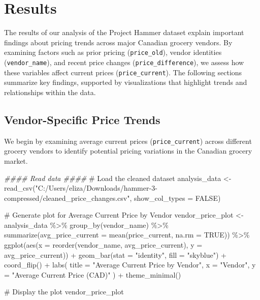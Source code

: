 \documentclass[
  letterpaper,
  DIV=11,
  numbers=noendperiod]{scrartcl}
\newenvironment{Shaded}{\begin{snugshade}}{\end{snugshade}}
\newcommand{\AttributeTok}[1]{\textcolor[rgb]{0.40,0.45,0.13}{#1}}
\newcommand{\CommentTok}[1]{\textcolor[rgb]{0.37,0.37,0.37}{#1}}
\newcommand{\ConstantTok}[1]{\textcolor[rgb]{0.56,0.35,0.01}{#1}}
\newcommand{\DocumentationTok}[1]{\textcolor[rgb]{0.37,0.37,0.37}{\textit{#1}}}
\newcommand{\FunctionTok}[1]{\textcolor[rgb]{0.28,0.35,0.67}{#1}}
\newcommand{\NormalTok}[1]{\textcolor[rgb]{0.00,0.23,0.31}{#1}}
\newcommand{\OtherTok}[1]{\textcolor[rgb]{0.00,0.23,0.31}{#1}}
\newcommand{\SpecialCharTok}[1]{\textcolor[rgb]{0.37,0.37,0.37}{#1}}
\newcommand{\StringTok}[1]{\textcolor[rgb]{0.13,0.47,0.30}{#1}}
\begin{document}
\section{Results}\label{results}

The results of our analysis of the Project Hammer dataset explain
important findings about pricing trends across major Canadian grocery
vendors. By examining factors such as prior pricing
(\texttt{price\_old}), vendor identities (\texttt{vendor\_name}), and
recent price changes (\texttt{price\_difference}), we assess how these
variables affect current prices (\texttt{price\_current}). The following
sections summarize key findings, supported by visualizations that
highlight trends and relationships within the data.

\subsection{Vendor-Specific Price
Trends}\label{vendor-specific-price-trends}

We begin by examining average current prices (\texttt{price\_current})
across different grocery vendors to identify potential pricing
variations in the Canadian grocery market.

\begin{Shaded}
\begin{Highlighting}[]
\DocumentationTok{\#\#\#\# Read data \#\#\#\#}
\CommentTok{\# Load the cleaned dataset}
\NormalTok{analysis\_data }\OtherTok{\textless{}{-}} \FunctionTok{read\_csv}\NormalTok{(}\StringTok{"C:/Users/eliza/Downloads/hammer{-}3{-}compressed/cleaned\_price\_changes.csv"}\NormalTok{, }\AttributeTok{show\_col\_types =} \ConstantTok{FALSE}\NormalTok{)}

\CommentTok{\# Generate plot for Average Current Price by Vendor}
\NormalTok{vendor\_price\_plot }\OtherTok{\textless{}{-}}\NormalTok{ analysis\_data }\SpecialCharTok{\%\textgreater{}\%}
  \FunctionTok{group\_by}\NormalTok{(vendor\_name) }\SpecialCharTok{\%\textgreater{}\%}
  \FunctionTok{summarize}\NormalTok{(}\AttributeTok{avg\_price\_current =} \FunctionTok{mean}\NormalTok{(price\_current, }\AttributeTok{na.rm =} \ConstantTok{TRUE}\NormalTok{)) }\SpecialCharTok{\%\textgreater{}\%}
  \FunctionTok{ggplot}\NormalTok{(}\FunctionTok{aes}\NormalTok{(}\AttributeTok{x =} \FunctionTok{reorder}\NormalTok{(vendor\_name, avg\_price\_current), }\AttributeTok{y =}\NormalTok{ avg\_price\_current)) }\SpecialCharTok{+}
  \FunctionTok{geom\_bar}\NormalTok{(}\AttributeTok{stat =} \StringTok{"identity"}\NormalTok{, }\AttributeTok{fill =} \StringTok{"skyblue"}\NormalTok{) }\SpecialCharTok{+}
  \FunctionTok{coord\_flip}\NormalTok{() }\SpecialCharTok{+}
  \FunctionTok{labs}\NormalTok{(}
    \AttributeTok{title =} \StringTok{"Average Current Price by Vendor"}\NormalTok{,}
    \AttributeTok{x =} \StringTok{"Vendor"}\NormalTok{,}
    \AttributeTok{y =} \StringTok{"Average Current Price (CAD)"}
\NormalTok{  ) }\SpecialCharTok{+}
  \FunctionTok{theme\_minimal}\NormalTok{()}

\CommentTok{\# Display the plot}
\NormalTok{vendor\_price\_plot}
\end{Highlighting}
\end{Shaded}
\end{document}
